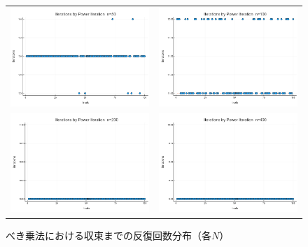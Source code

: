 \documentclass[a4paper,11pt]{ltjsarticle}
\begin{document}
\begin{figure}[H]
  \centering
  \begin{tabular}{cc}
    \includegraphics[width=72mm]{graphs/exp3_n50_iterations.png} &
    \includegraphics[width=72mm]{graphs/exp3_n100_iterations.png} \\
    \includegraphics[width=72mm]{graphs/exp3_n200_iterations.png} &
    \includegraphics[width=72mm]{graphs/exp3_n400_iterations.png} \\
  \end{tabular}
  \caption{べき乗法における収束までの反復回数分布（各$N$）}
  \label{fig:exp3_iterations}
\end{figure}
\end{document}
